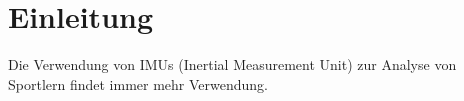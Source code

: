 \chapter{Einleitung}
Die Verwendung von IMUs (Inertial Measurement Unit) zur Analyse von Sportlern findet immer mehr Verwendung.

